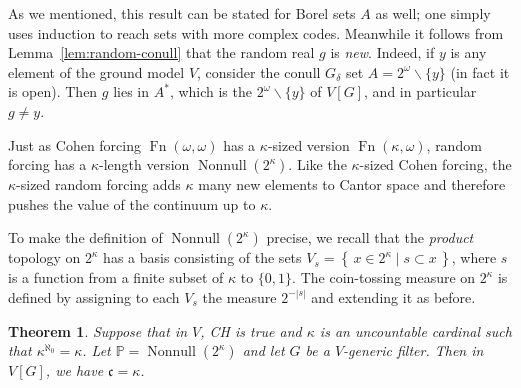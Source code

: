\documentclass[11pt,oneside,a4paper]{amsbook}
\newcommand{\set}[1]{\left\{\,#1\,\right\}}
\newcommand{\PP}{\mathbb P}
\DeclareMathOperator{\Fn}{Fn}
\DeclareMathOperator{\Nonnull}{Nonnull}
\theoremstyle{definition}
\theoremstyle{plain}
\newtheorem{theorem}{Theorem}[section]
\theoremstyle{definition}
\theoremstyle{remark}
\numberwithin{equation}{section}
\numberwithin{figure}{section}
\begin{document}
As we mentioned, this result can be stated for Borel sets $A$ as well; one simply uses induction to reach sets with more complex codes. Meanwhile it follows from Lemma~\ref{lem:random-conull} that the random real $g$ is \emph{new}. Indeed, if $y$ is any element of the ground model $V$, consider the conull $G_\delta$ set $A=2^\omega\smallsetminus\{y\}$ (in fact it is open). Then $g$ lies in $A^*$, which is the $2^\omega\smallsetminus\{y\}$ of $V[G]$, and in particular $g\neq y$.

Just as Cohen forcing $\Fn(\omega,\omega)$ has a $\kappa$-sized version $\Fn(\kappa,\omega)$, random forcing has a $\kappa$-length version $\Nonnull(2^\kappa)$. Like the $\kappa$-sized Cohen forcing, the $\kappa$-sized random forcing adds $\kappa$ many new elements to Cantor space and therefore pushes the value of the continuum up to $\kappa$.

To make the definition of $\Nonnull(2^\kappa)$ precise, we recall that the \emph{product} topology on $2^\kappa$ has a basis consisting of the sets $V_s=\set{x\in2^\kappa\mid s\subset x}$, where $s$ is a function from a finite subset of $\kappa$ to $\{0,1\}$. The coin-tossing measure on $2^\kappa$ is defined by assigning to each $V_s$ the measure $2^{-|s|}$ and extending it as before.

\begin{theorem}
  Suppose that in $V$, CH is true and $\kappa$ is an uncountable cardinal such that $\kappa^{\aleph_0}=\kappa$. Let $\PP=\Nonnull(2^\kappa)$ and let $G$ be a $V$-generic filter. Then in $V[G]$, we have $\mathfrak c=\kappa$.
\end{theorem}
\end{document}
